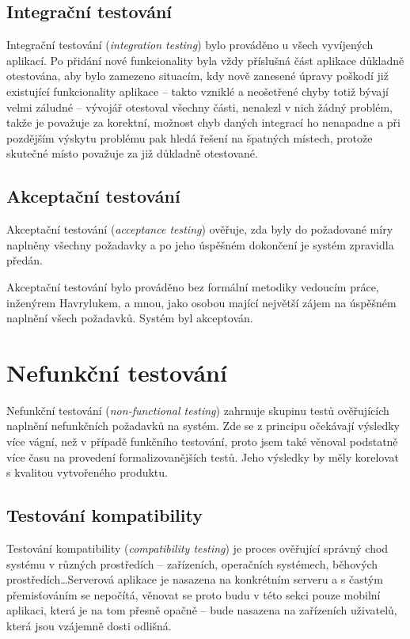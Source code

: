 \subsection{Integrační testování}
Integrační testování (\textit{integration testing}) bylo prováděno u všech vyvíjených aplikací. Po přidání nové funkcionality byla vždy příslušná část aplikace důkladně otestována, aby bylo zamezeno situacím, kdy nově zanesené úpravy poškodí již existující funkcionality aplikace -- takto vzniklé a neošetřené chyby totiž bývají velmi záludné -- vývojář otestoval všechny části, nenalezl v nich žádný problém, takže je považuje za korektní, možnost chyb daných integrací ho nenapadne a při pozdějším výskytu problému pak hledá řešení na špatných místech, protože skutečné místo považuje za již důkladně otestované.

\subsection{Akceptační testování}
Akceptační testování (\textit{acceptance testing}) ověřuje, zda byly do požadované míry naplněny všechny požadavky a po jeho úspěšném dokončení je systém zpravidla předán.

Akceptační testování bylo prováděno bez formální metodiky vedoucím práce, inženýrem Havrylukem, a mnou, jako osobou mající největší zájem na úspěšném naplnění všech požadavků. Systém byl akceptován.


\section{Nefunkční testování}
Nefunkční testování (\textit{non-functional testing}) zahrnuje skupinu testů ověřujících naplnění nefunkčních požadavků na systém. Zde se z principu očekávají výsledky více vágní, než v případě funkčního testování, proto jsem také věnoval podstatně více času na provedení formalizovanějších testů. Jeho výsledky by měly korelovat s kvalitou vytvořeného produktu.

\subsection{Testování kompatibility}
\label{sec:test:compat}
Testování kompatibility (\textit{compatibility testing}) je proces ověřující správný chod systému v různých prostředích -- zařízeních, operačních systémech, běhových prostředích\dots Serverová aplikace je nasazena na konkrétním serveru a s častým přemisťováním se nepočítá, věnovat se proto budu v této sekci pouze mobilní aplikaci, která je na tom přesně opačně -- bude nasazena na zařízeních uživatelů, která jsou vzájemně dosti odlišná.

